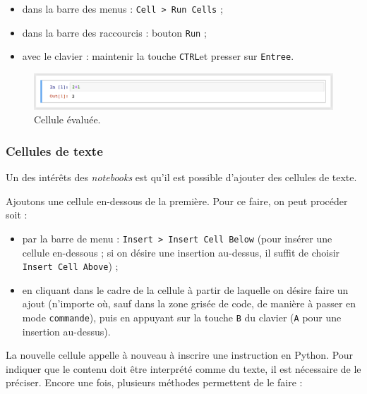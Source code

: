 \documentclass[
  12pt,
]{book}
\providecommand{\tightlist}{%
  \setlength{\itemsep}{0pt}\setlength{\parskip}{0pt}}
\numberwithin{equation}{section}
\numberwithin{countremarque}{section}
\begin{document}
\begin{itemize}
\tightlist
\item
  dans la barre des menus : \texttt{Cell\ \textgreater{}\ Run\ Cells} ;
\item
  dans la barre des raccourcis : bouton \texttt{Run} ;
\item
  avec le clavier : maintenir la touche \texttt{CTRL}et presser sur \texttt{Entree}.
\end{itemize}

\begin{figure}[H]

{\centering \includegraphics[width=1\linewidth]{figs/jupyter_notebook_2} 

}

\caption{Cellule évaluée.}\label{fig:unnamed-chunk-9}
\end{figure}

\subsubsection{Cellules de texte}\label{cellules-de-texte}

Un des intérêts des \emph{notebooks} est qu'il est possible d'ajouter des cellules de texte.

Ajoutons une cellule en-dessous de la première. Pour ce faire, on peut procéder soit :

\begin{itemize}
\tightlist
\item
  par la barre de menu : \texttt{Insert\ \textgreater{}\ Insert\ Cell\ Below} (pour insérer une cellule en-dessous ; si on désire une insertion au-dessus, il suffit de choisir \texttt{Insert\ Cell\ Above}) ;
\item
  en cliquant dans le cadre de la cellule à partir de laquelle on désire faire un ajout (n'importe où, sauf dans la zone grisée de code, de manière à passer en mode \texttt{commande}), puis en appuyant sur la touche \texttt{B} du clavier (\texttt{A} pour une insertion au-dessus).
\end{itemize}

La nouvelle cellule appelle à nouveau à inscrire une instruction en Python. Pour indiquer que le contenu doit être interprété comme du texte, il est nécessaire de le préciser. Encore une fois, plusieurs méthodes permettent de le faire :
\end{document}
